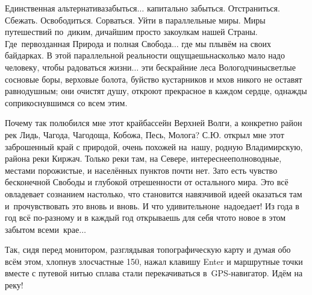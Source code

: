 
Единственная альтернатива\mdash забыться$\ldots$ капитально забыться. Отстраниться. Сбежать. Освободиться. Сорваться. Уйти в параллельные миры. Миры путешествий по~диким, дичайшим просто закоулкам нашей Страны. Где~первозданная Природа и полная Свобода$\ldots$ где мы плывём на своих байдарках. В этой параллельной реальности ощущаешь\mdash насколько мало надо человеку, чтобы радоваться жизни$\ldots$ эти бескрайние леса Вологодчины\mdash светлые сосновые боры, верховые болота, буйство кустарников и мхов никого не оставят равнодушным; они очистят душу, откроют прекрасное в каждом сердце, однажды соприкоснувшимся со всем этим. 

Почему так полюбился мне этот край\mdash бассейн Верхней Волги, а конкретно район рек Лидь, Чагода, Чагодоща, Кобожа, Песь, Молога? С.Ю. открыл мне этот заброшенный край с природой, очень похожей на~нашу, родную Владимирскую, района реки Киржач. Только реки там, на Севере, интереснее\mdash полноводные, местами порожистые, и населённых пунктов почти нет. Зато есть чувство бесконечной Свободы и глубокой отрешенности от остального мира. Это всё овладевает сознанием настолько, что становится навязчивой идеей оказаться там и~прочувствовать это вновь и вновь. И что удивительно\mdash не~надоедает! Из года в год всё по-разному и в каждый год открываешь для себя что\sdash то новое в этом забытом всеми~крае$\ldots$
 
Так, сидя перед монитором, разглядывая топографическую карту и думая обо всём этом, хлопнув злосчастные 150, нажал клавишу Enter и маршрутные точки вместе с путевой нитью сплава стали перекачиваться в~GPS-навигатор. Идём на реку!%

\begin{center}
\end{center}
